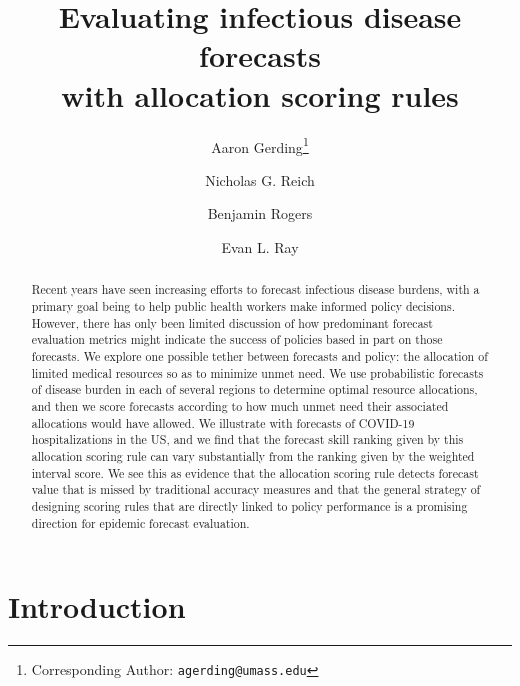 \documentclass{article}\usepackage[]{graphicx}\usepackage[]{xcolor}
\author{Aaron Gerding\thanks{Corresponding Author: \texttt{agerding@umass.edu}}}
\author{Nicholas G. Reich}
\author{Benjamin Rogers}
\author{Evan L. Ray}
\affil{Department of Biostatistics and Epidemiology, School of Public Health and Health
Sciences, University of Massachusetts at Amherst}
\title{Evaluating infectious disease forecasts \\ with allocation scoring rules}
\begin{document}
\newcommand{\del}[2]{\frac{\partial {#1} }{\partial {#2}} }
\newcommand{\dby}[2]{\frac{d {#1} }{d {#2}} }
\newcommand{\sbar}{\overline{s}}
\newtheorem{proposition}{Proposition}

\theoremstyle{remark}
\newtheorem*{remark}{Remark}

\maketitle







\begin{abstract}

Recent years have seen increasing efforts to forecast infectious disease burdens, with a primary goal being to help
public health workers make informed policy decisions. However, there has only been limited discussion of how
predominant forecast evaluation metrics might indicate the success of policies based in part on those forecasts. We
explore one possible tether between forecasts and policy: the allocation of limited medical resources so as to minimize
unmet need. We use probabilistic forecasts of disease burden in each of several regions to determine optimal resource
allocations, and then we score forecasts according to how much unmet need their associated allocations would have
allowed. We illustrate with forecasts of COVID-19 hospitalizations in the US, and we find that the forecast skill
ranking given by this allocation scoring rule can vary substantially from the ranking given by the weighted interval
score. We see this as evidence that the allocation scoring rule detects forecast value that is missed by traditional
accuracy measures and that the general strategy of designing scoring rules that are directly linked to policy
performance is a promising direction for epidemic forecast evaluation.

\end{abstract}

\section{Introduction}
\end{document}

